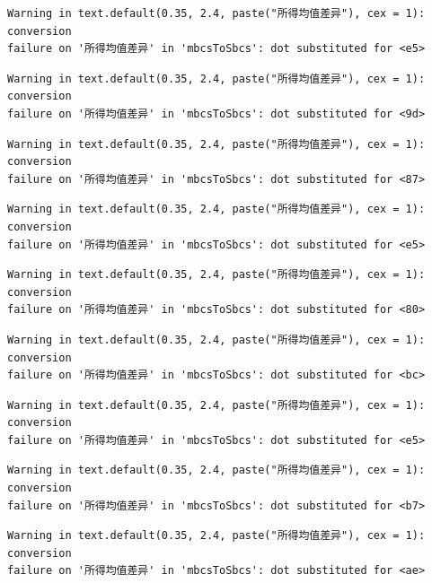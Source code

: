 \documentclass[
  letterpaper,
  DIV=11,
  numbers=noendperiod]{scrreprt}
\begin{document}
\begin{verbatim}
Warning in text.default(0.35, 2.4, paste("所得均值差异"), cex = 1): conversion
failure on '所得均值差异' in 'mbcsToSbcs': dot substituted for <e5>
\end{verbatim}

\begin{verbatim}
Warning in text.default(0.35, 2.4, paste("所得均值差异"), cex = 1): conversion
failure on '所得均值差异' in 'mbcsToSbcs': dot substituted for <9d>
\end{verbatim}

\begin{verbatim}
Warning in text.default(0.35, 2.4, paste("所得均值差异"), cex = 1): conversion
failure on '所得均值差异' in 'mbcsToSbcs': dot substituted for <87>
\end{verbatim}

\begin{verbatim}
Warning in text.default(0.35, 2.4, paste("所得均值差异"), cex = 1): conversion
failure on '所得均值差异' in 'mbcsToSbcs': dot substituted for <e5>
\end{verbatim}

\begin{verbatim}
Warning in text.default(0.35, 2.4, paste("所得均值差异"), cex = 1): conversion
failure on '所得均值差异' in 'mbcsToSbcs': dot substituted for <80>
\end{verbatim}

\begin{verbatim}
Warning in text.default(0.35, 2.4, paste("所得均值差异"), cex = 1): conversion
failure on '所得均值差异' in 'mbcsToSbcs': dot substituted for <bc>
\end{verbatim}

\begin{verbatim}
Warning in text.default(0.35, 2.4, paste("所得均值差异"), cex = 1): conversion
failure on '所得均值差异' in 'mbcsToSbcs': dot substituted for <e5>
\end{verbatim}

\begin{verbatim}
Warning in text.default(0.35, 2.4, paste("所得均值差异"), cex = 1): conversion
failure on '所得均值差异' in 'mbcsToSbcs': dot substituted for <b7>
\end{verbatim}

\begin{verbatim}
Warning in text.default(0.35, 2.4, paste("所得均值差异"), cex = 1): conversion
failure on '所得均值差异' in 'mbcsToSbcs': dot substituted for <ae>
\end{verbatim}
\end{document}
